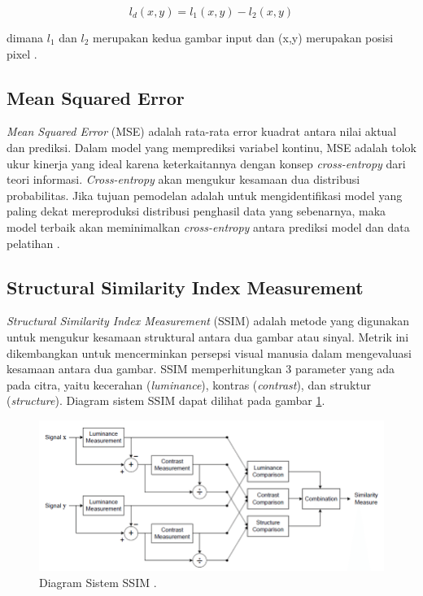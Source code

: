 \begin{equation}
  \label{eq:imagediff}
  l_{d}(x,y) =  l_{1}(x,y) - l_{2}(x,y) 
\end{equation}

dimana $l_{1}$ dan $l_{2}$ merupakan kedua gambar input dan (x,y) merupakan posisi pixel \parencite{imgdiff}.

\subsection{Mean Squared Error}
\label{subsec:MSE}

\emph{Mean Squared Error} (MSE) adalah rata-rata error kuadrat antara nilai aktual dan prediksi. 
Dalam model yang memprediksi variabel kontinu, MSE adalah tolok ukur kinerja yang ideal karena keterkaitannya dengan konsep \emph{cross-entropy} dari teori informasi. 
\emph{Cross-entropy} akan mengukur kesamaan dua distribusi probabilitas. 
Jika tujuan pemodelan adalah untuk mengidentifikasi model yang paling dekat mereproduksi distribusi penghasil data yang sebenarnya, maka model terbaik akan meminimalkan \emph{cross-entropy} antara prediksi model dan data pelatihan \parencite{MSE}. 

\subsection{Structural Similarity Index Measurement}
\label{subsec:SSIM}

\emph{Structural Similarity Index Measurement} (SSIM) adalah metode yang digunakan untuk mengukur kesamaan struktural antara dua gambar atau sinyal. 
Metrik ini dikembangkan untuk mencerminkan persepsi visual manusia dalam mengevaluasi kesamaan antara dua gambar. 
SSIM memperhitungkan 3 parameter yang ada pada citra, yaitu kecerahan (\emph{luminance}), kontras (\emph{contrast}), dan struktur (\emph{structure}). 
Diagram sistem SSIM dapat dilihat pada gambar \ref{fig:SSIM}.

\begin{figure}[ht]
  \centering
  \includegraphics[scale=0.5]{gambar/SSIM.png}
  \caption{Diagram Sistem SSIM \parencite{SSIM}.}
  \label{fig:SSIM}
\end{figure}

